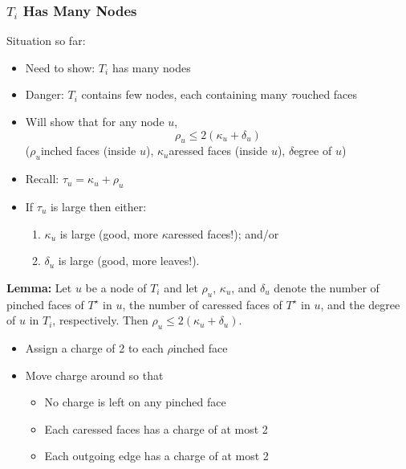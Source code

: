 \documentclass[xcolor=dvipsnames]{beamer}
\newcommand{\dual}[1]{#1^\star}
\begin{document}
\begin{frame}
  \frametitle{$T_i$ Has Many Nodes}

  Situation so far:
  \begin{itemize}[<+->]
    \item Need to show: $T_i$ has many nodes
    \item Danger: $T_i$ contains few nodes, each containing many $\tau$ouched faces
    \item Will show that for any node $u$,
      \[   \rho_u \le 2(\kappa_u + \delta_u)  \]
     ($\rho_u$inched faces (inside $u$), $\kappa_u$aressed faces (inside $u$),  
        $\delta$egree of $u$)
    \item Recall: $\tau_u=\kappa_u+\rho_u$
    \item If $\tau_u$ is large then either:
       \begin{enumerate}[<+->]
          \item $\kappa_u$ is large (good, more $\kappa$aressed faces!); and/or
          \item $\delta_u$ is large (good, more leaves!).
       \end{enumerate}
  \end{itemize}
\end{frame}


\begin{frame}

\textbf{Lemma:}
Let $u$ be a node of $T_i$ {\color{gray}and let $\rho_u$, $\kappa_u$, and $\delta_u$ denote the number of pinched faces of $\dual{T}$ in $u$, the number of caressed faces of $\dual{T}$ in $u$, and the degree of $u$ in $T_i$, respectively}.  Then $\rho_u \le 2(\kappa_u+\delta_u)$.

\begin{itemize}
  \item<3-> Assign a charge of 2 to each $\rho$inched face
  \item<4-> Move charge around so that
  \begin{itemize}
    \item<5->No charge is left on any pinched face
    \item<6->Each caressed faces has a charge of at most 2
    \item<7->Each outgoing edge has a charge of at most 2
  \end{itemize}
\end{itemize}
\end{frame}
\end{document}

